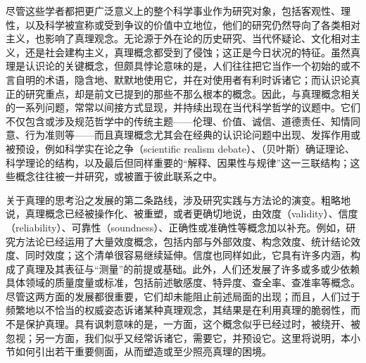 尽管这些学者都把更广泛意义上的整个科学事业作为研究对象，包括客观性、理性，以及科学被宣称或受到争议的价值中立地位，他们的研究仍然导向了各类相对主义，也影响了真理观念。无论源于外在论的历史研究、当代怀疑论、文化相对主义，还是社会建构主义，真理概念都受到了侵蚀；这正是今日状况的特征。虽然真理是认识论的关键概念，但颇具悖论意味的是，人们往往把它当作一个初始的或不言自明的术语，隐含地、默默地使用它，并在对使用者有利时诉诸它；而认识论真正的研究重点，却是前文已提到的那些不那么根本的概念。因此，与真理概念相关的一系列问题，常常以间接方式显现，并持续出现在当代科学哲学的议题中。它们不仅包含或涉及规范哲学中的传统主题——伦理、价值、诚信、道德责任、知情同意、行为准则等——而且真理概念尤其会在经典的认识论问题中出现、发挥作用或被预设，例如科学实在论之争（scientific realism debate）、（贝叶斯）确证理论、科学理论的结构，以及最后但同样重要的“解释、因果性与规律”这一三联结构；这些概念往往被一并研究，或被置于彼此联系之中。

关于真理的思考沿之发展的第二条路线，涉及研究实践与方法论的演变。粗略地说，真理概念已经被操作化、被重塑，或者更确切地说，由效度（validity）、信度（reliability）、可靠性（soundness）、正确性或准确性等概念加以补充。例如，研究方法论已经运用了大量效度概念，包括内部与外部效度、构念效度、统计结论效度、同时效度；这个清单很容易继续延伸。信度也同样如此，它具有许多内涵，构成了真理及其表征与“测量”的前提或基础。此外，人们还发展了许多或多或少依赖具体领域的质量度量或标准，包括前述敏感度、特异度、查全率、查准率等概念。尽管这两方面的发展都很重要，它们却未能阻止前述局面的出现；而且，人们过于频繁地以不恰当的权威姿态诉诸某种真理观念，其结果是在利用真理的脆弱性，而不是保护真理。具有讽刺意味的是，一方面，这个概念似乎已经过时，被绕开、被忽视；另一方面，我们似乎又经常诉诸它，需要它，并预设它。这里将说明，本小节如何引出若干重要侧面，从而塑造或至少照亮真理的困境。
